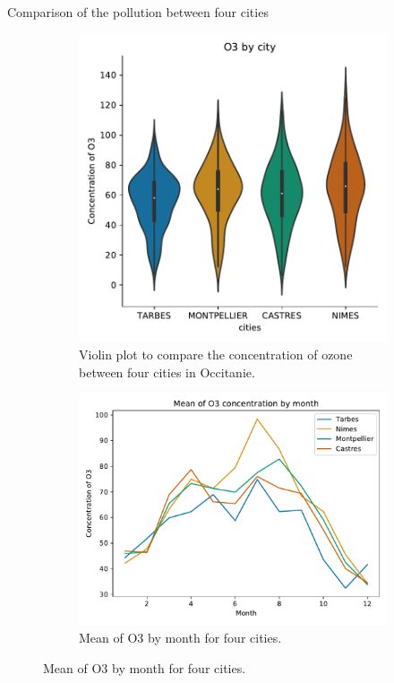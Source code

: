 \documentclass[unknownkeysallowed]{beamer}
\begin{document}
\begin{frame}{Comparison of the pollution between four cities}

\begin{figure}[!tbp]
  \begin{subfigure}[b]{0.49\textwidth}
\includegraphics[width=\textwidth]{O3_by_city.pdf}
\caption{Violin plot to compare the concentration of ozone between four cities in Occitanie.}
    \label{fig:f1}
  \end{subfigure}
  \hfill
  \begin{subfigure}[b]{0.49\textwidth}
\includegraphics[width=\textwidth]{Mean_of_O3.pdf}
\vspace{.35cm}
\caption{Mean of O3 by month for four cities.}
    \label{fig:f2}
  \end{subfigure}
\end{figure}

\end{frame}
\end{document}

